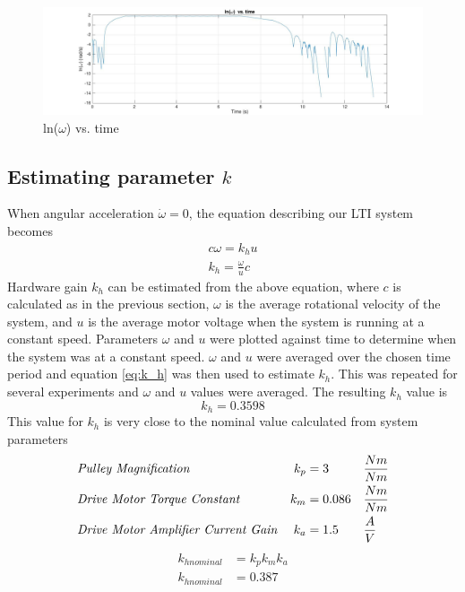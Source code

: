 \documentclass[11pt,titlepage]{article}
\begin{document}
	\begin{figure}[h!]
		\centering
		\includegraphics[trim={6cm 0 0 0},clip,angle=0,origin=c,scale=0.3]{lnw_vs_time}
		\caption{ln($\omega$) vs. time}
		\label{fig:lnw_vs_time}
	\end{figure}
	
	\subsection{Estimating parameter $k$}
	When angular acceleration $\dot{\omega}=0$, the equation describing our LTI system becomes
	\begin{align}
		c\omega=k_hu\nonumber\\
		k_h=\frac{\omega}{u}c\label{eq:k_h}
	\end{align}
	Hardware gain $k_h$ can be estimated from the above equation, where $c$ is calculated as in the previous section, $\omega$ is the average rotational velocity of the system, and $u$ is the average motor voltage when the system is running at a constant speed. Parameters $\omega$ and $u$ were plotted against time to determine when the system was at a constant speed. $\omega$ and $u$ were averaged over the chosen time period and equation \ref{eq:k_h} was then used to estimate $k_h$. This was repeated for several experiments and $\omega$ and $u$ values were averaged. The resulting $k_h$ value is
	\begin{equation}
		k_h=0.3598\nonumber
	\end{equation}
	This value for $k_h$ is very close to the nominal value calculated from system parameters 
	\begin{align*}
		&\mbox{\emph{Pulley Magnification}} 				& 		k_p&=3 		&	&\frac{Nm}{Nm}\\
		&\mbox{\emph{Drive Motor Torque Constant}} 			&	 	k_m&=0.086 	&	&\frac{Nm}{Nm}\\
		&\mbox{\emph{Drive Motor Amplifier Current Gain}} 	& 		k_a&=1.5 	&	&\frac{A}{V}
	\end{align*}
	\begin{align*}
		k_{h nominal}&=k_pk_mk_a\\
		k_{h nominal}&=0.387
	\end{align*}
\end{document}
